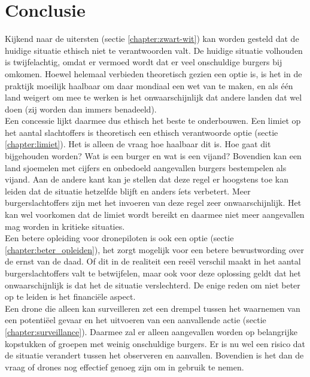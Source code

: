 \section{Conclusie}
\subtitle{Tim Hosman \& Dani\"el Brouwer}
Kijkend naar de uitersten (sectie \ref{chapter:zwart-wit}) kan worden gesteld dat de huidige situatie ethisch niet te verantwoorden valt. De huidige situatie volhouden is twijfelachtig, omdat er vermoed wordt dat er veel onschuldige burgers bij omkomen. Hoewel helemaal verbieden theoretisch gezien een optie is, is het in de praktijk moeilijk haalbaar om daar mondiaal een wet van te maken, en als \'e\'en land weigert om mee te werken is het onwaarschijnlijk dat andere landen dat wel doen (zij worden dan immers benadeeld).\\

Een concessie lijkt daarmee dus ethisch het beste te onderbouwen. Een limiet op het aantal slachtoffers is theoretisch een ethisch verantwoorde optie (sectie \ref{chapter:limiet}). Het is alleen de vraag hoe haalbaar dit is. Hoe gaat dit bijgehouden worden? Wat is een burger en wat is een vijand? Bovendien kan een land sjoemelen met cijfers en onbedoeld aangevallen burgers bestempelen als vijand. Aan de andere kant kan je stellen dat deze regel er hoogstens toe kan leiden dat de situatie hetzelfde blijft en anders \'iets verbetert. Meer burgerslachtoffers zijn met het invoeren van deze regel zeer onwaarschijnlijk. Het kan wel voorkomen dat de limiet wordt bereikt en daarmee niet meer aangevallen mag worden in kritieke situaties.\\

Een betere opleiding voor dronepiloten is ook een optie (sectie \ref{chapter:beter_opleiden}), het zorgt mogelijk voor een betere bewustwording over de ernst van de daad. Of dit in de realiteit een ree\"el verschil maakt in het aantal burgerslachtoffers valt te betwijfelen, maar ook voor deze oplossing geldt dat het onwaarschijnlijk is dat het de situatie verslechterd. De enige reden om niet beter op te leiden is het financi\"ele aspect.\\

Een drone die alleen kan surveilleren zet een drempel tussen het waarnemen van een potenti\"eel gevaar en het uitvoeren van een aanvallende actie (sectie \ref{chapter:surveillance}). Daarmee zal er alleen aangevallen worden op belangrijke kopstukken of groepen met weinig onschuldige burgers. Er is nu wel een risico dat de situatie verandert tussen het observeren en aanvallen. Bovendien is het dan de vraag of drones nog effectief genoeg zijn om in gebruik te nemen.\\

